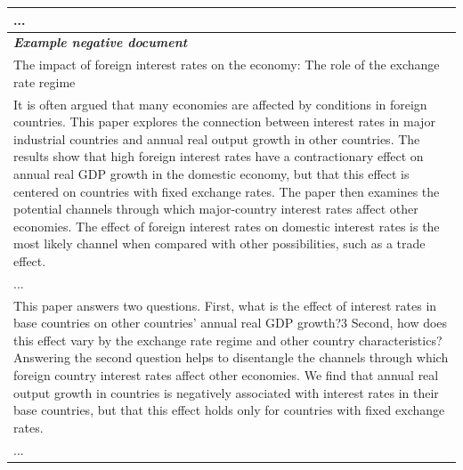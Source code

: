 \begin{table}[ht]
\begin{tabular}{p{13cm}}
... \\
\midrule
\textit{\textbf{Example negative document}} \\
\midrule
The impact of foreign interest rates on the economy: The role of the exchange rate regime\\
It is often argued that many economies are affected by conditions in foreign countries. This paper explores the connection
between interest rates in major industrial countries and annual real output growth in other countries. The results show that high
foreign interest rates have a contractionary effect on annual real GDP growth in the domestic economy, but that this effect is
centered on countries with fixed exchange rates. The paper then examines the potential channels through which major-country
interest rates affect other economies. The effect of foreign interest rates on domestic interest rates is the most likely channel when
compared with other possibilities, such as a trade effect. \\
... \\
This paper answers two questions. First, what is the effect of interest rates in base countries on other countries' annual
real GDP growth?3 Second, how does this effect vary by the exchange rate regime and other country characteristics?
Answering the second question helps to disentangle the channels through which foreign country interest rates affect
other economies. We find that annual real output growth in countries is negatively associated with interest rates in their
base countries, but that this effect holds only for countries with fixed exchange rates. \\
... \\
\bottomrule
\end{tabular}
\label{tab:economic_example}
\end{table}